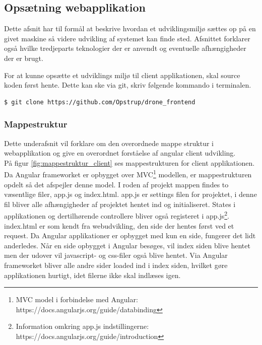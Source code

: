 \subsection{Opsætning webapplikation}
Dette afsnit har til formål at beskrive hvordan et udviklingsmiljø sættes op på en givet maskine så videre udvikling af systemet kan finde sted. Afsnittet forklarer også hvilke tredjeparts teknologier der er anvendt og eventuelle afhængigheder der er brugt.

For at kunne opsætte et udviklings miljø til client applikationen, skal source koden først hente. Dette kan ske via git, skriv følgende kommando i terminalen.

\begin{lstlisting}[language=bash]
	$ git clone https://github.com/Opstrup/drone_frontend
\end{lstlisting}

\vspace{-1cm}

\subsubsection*{Mappestruktur}
Dette underafsnit vil forklare om den overordnede mappe struktur i webapplikation og give en overordnet forståelse af angular client udvikling. \\

På figur \ref{fig:mappestruktur_client} ses mappestrukturen for client applikationen. Da Angular frameworket er opbygget over MVC\footnote{MVC model i forbindelse med Angular: https://docs.angularjs.org/guide/databinding} modellen, er mappestrukturen opdelt så det afspejler denne model. I roden af projekt mappen findes to væsentlige filer, app.js og index.html. 
app.js er settings filen for projektet, i denne fil bliver alle afhængigheder af projektet hentet ind og initialiseret. States i applikationen og dertilhørende controllere bliver også registeret i app.js\footnote{Information omkring app.js indstillingerne: https://docs.angularjs.org/guide/introduction}.\\
index.html er som kendt fra webudvikling, den side der hentes først ved et request. Da Angular applikationer er opbygget med kun en side, fungerer det lidt anderledes. Når en side opbygget i Angular besøges, vil index siden blive hentet men der udover vil javascript- og css-filer også blive hentet. Via Angular frameworket bliver alle andre sider loaded ind i index siden, hvilket gøre applikationen hurtigt, idet filerne ikke skal indlæses igen.

